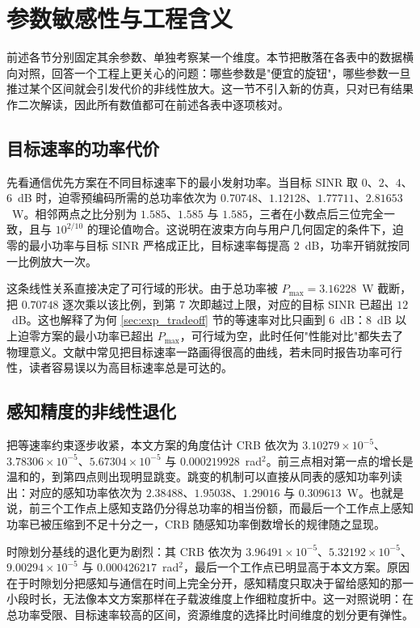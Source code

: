 \section{参数敏感性与工程含义}
\label{sec:exp_sensitivity}

前述各节分别固定其余参数、单独考察某一个维度。本节把散落在各表中的数据横向对照，回答一个工程上更关心的问题：哪些参数是"便宜的旋钮"，哪些参数一旦推过某个区间就会引发代价的非线性放大。这一节不引入新的仿真，只对已有结果作二次解读，因此所有数值都可在前述各表中逐项核对。

\subsection{目标速率的功率代价}

先看通信优先方案在不同目标速率下的最小发射功率。当目标 SINR 取 $0$、$2$、$4$、$6$~dB 时，迫零预编码所需的总功率依次为 $0.70748$、$1.12128$、$1.77711$、$2.81653$~W。相邻两点之比分别为 $1.585$、$1.585$ 与 $1.585$，三者在小数点后三位完全一致，且与 $10^{2/10}$ 的理论值吻合。这说明在波束方向与用户几何固定的条件下，迫零的最小功率与目标 SINR 严格成正比，目标速率每提高 $2$~dB，功率开销就按同一比例放大一次。

这条线性关系直接决定了可行域的形状。由于总功率被 $P_{\max}=3.16228$~W 截断，把 $0.70748$ 逐次乘以该比例，到第 $7$ 次即越过上限，对应的目标 SINR 已超出 $12$~dB。这也解释了为何 \ref{sec:exp_tradeoff} 节的等速率对比只画到 $6$~dB：$8$~dB 以上迫零方案的最小功率已超出 $P_{\max}$，可行域为空，此时任何"性能对比"都失去了物理意义。文献中常见把目标速率一路画得很高的曲线，若未同时报告功率可行性，读者容易误以为高目标速率总是可达的。

\subsection{感知精度的非线性退化}

把等速率约束逐步收紧，本文方案的角度估计 CRB 依次为 $3.10279\times10^{-5}$、$3.78306\times10^{-5}$、$5.67304\times10^{-5}$ 与 $0.000219928$~rad$^2$。前三点相对第一点的增长是温和的，到第四点则出现明显跳变。跳变的机制可以直接从同表的感知功率列读出：对应的感知功率依次为 $2.38488$、$1.95038$、$1.29016$ 与 $0.309613$~W。也就是说，前三个工作点上感知支路仍分得总功率的相当份额，而最后一个工作点上感知功率已被压缩到不足十分之一，CRB 随感知功率倒数增长的规律随之显现。

时隙划分基线的退化更为剧烈：其 CRB 依次为 $3.96491\times10^{-5}$、$5.32192\times10^{-5}$、$9.00294\times10^{-5}$ 与 $0.000426217$~rad$^2$，最后一个工作点已明显高于本文方案。原因在于时隙划分把感知与通信在时间上完全分开，感知精度只取决于留给感知的那一小段时长，无法像本文方案那样在子载波维度上作细粒度折中。这一对照说明：在总功率受限、目标速率较高的区间，资源维度的选择比时间维度的划分更有弹性。


